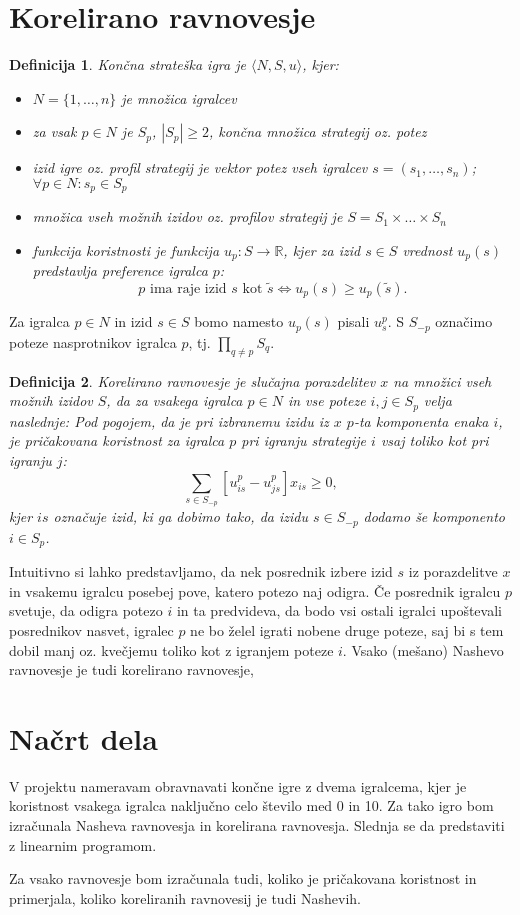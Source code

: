\documentclass{article}
\newtheorem{definition}{Definicija}
\begin{document}
\section*{Korelirano ravnovesje}
\begin{definition}
    \emph{Končna strateška igra} je $\langle N, S, u \rangle$, kjer:
    \begin{itemize}
        \item $N = \{ 1, \dots, n \}$ je \emph{množica igralcev}
        \item za vsak $p \in N$ je $S_p$, $|S_p|\geq 2$, končna množica \emph{strategij} oz. \emph{potez}
        \item \emph{izid igre} oz. \emph{profil strategij} je vektor potez vseh igralcev $s = (s_1, \dots, s_n)$; $\forall p \in N: s_p \in S_p$
        \item \emph{množica vseh možnih izidov} oz. \emph{profilov strategij} je $S = S_1 \times \dots \times S_n$ 
        \item \emph{funkcija koristnosti} je funkcija $u_p: S \to \mathbb{R}$, kjer za izid $s \in S$ vrednost $u_p(s)$ predstavlja preference igralca $p$: 
        $$ \text{$p$ ima raje izid $s$ kot $\tilde{s}$} \iff u_p(s) \geq u_p(\tilde{s}). $$
    \end{itemize}
\end{definition}
Za igralca $p\in N$ in izid $s \in S$ bomo namesto $u_p(s)$ pisali $u_s^p$. S $S_{-p}$ označimo poteze nasprotnikov igralca $p$, tj. $\prod\limits_{q \neq p} S_q$.

\begin{definition}
    \emph{Korelirano ravnovesje} je slučajna porazdelitev $x$ na množici vseh možnih izidov $S$, da za vsakega igralca $p\in N$ in vse poteze $i,j\in S_p$ velja naslednje:
    Pod pogojem, da je pri izbranemu izidu iz $x$ $p$-ta komponenta enaka $i$, je pričakovana koristnost za igralca $p$ pri igranju strategije $i$ vsaj toliko kot pri igranju $j$:
    $$ \sum_{s\in S_{-p}} [u_{is}^p - u_{js}^p] x_{is} \geq 0, $$
kjer $is$ označuje izid, ki ga dobimo tako, da izidu $s \in S_{-p}$ dodamo še komponento $i\in S_p$.
\end{definition}

Intuitivno si lahko predstavljamo, da nek posrednik izbere izid $s$ iz porazdelitve $x$ in vsakemu igralcu posebej pove, katero potezo naj odigra. Če posrednik igralcu $p$ svetuje, da odigra potezo $i$ in ta predvideva, da bodo vsi ostali igralci upoštevali posrednikov nasvet, igralec $p$ ne bo želel igrati nobene druge poteze, saj bi s tem dobil manj oz. kvečjemu toliko kot z igranjem poteze $i$. Vsako (mešano) Nashevo ravnovesje je tudi korelirano ravnovesje, 

\section*{Načrt dela}
V projektu nameravam obravnavati končne igre z dvema igralcema, kjer je koristnost vsakega igralca naključno celo število med 0 in 10. Za tako igro bom izračunala Nasheva ravnovesja in korelirana ravnovesja. Slednja se da predstaviti z linearnim programom. 

Za vsako ravnovesje bom izračunala tudi, koliko je pričakovana koristnost in primerjala, koliko koreliranih ravnovesij je tudi Nashevih. 
\end{document}
